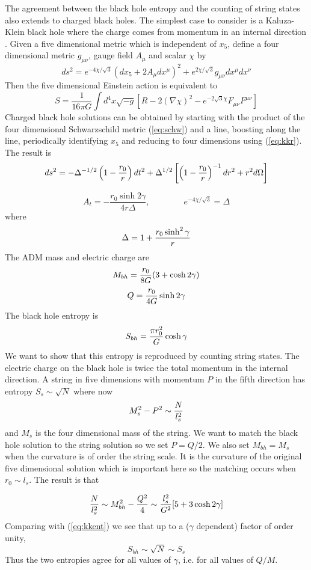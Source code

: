 \documentclass[12pt]{article}
\newcommand{\eq}{\begin{equation}}
\newcommand{\eqe}{\end{equation}}
\newcommand{\e}[1]{\label{eq:#1}}
\newcommand{\ee}[1]{(\ref{eq:#1})}
\begin{document}
The agreement between the black hole entropy and the counting of
string states also extends to charged black holes. The simplest
case to consider is a Kaluza-Klein black hole where the charge comes from 
momentum in an internal direction \cite{kk}. 
Given  a five dimensional metric which is
independent of $x_5$, define a four dimensional metric $g_{\mu\nu}$,
gauge field $A_\mu$ and scalar $\chi$ by
\eq\e{kkr}
ds^2 = e^{-4\chi/\sqrt 3} ( dx_5 + 2 A_\mu dx^\mu)^2
+ e^{2\chi/\sqrt 3} g_{\mu\nu} dx^\mu dx^\nu 
\eqe
Then the five dimensional Einstein action is equivalent to
\eq
S= \frac{1}{16\pi G} \int d^4x \sqrt{-g}[R - 2(\nabla \chi)^2 - 
e^{-2\sqrt 3 \chi}F_{\mu\nu} F^{\mu\nu}]
\eqe
Charged black hole solutions can
be obtained by starting with the product of the four dimensional 
Schwarzschild metric \ee{schw} and a line, boosting along the line,  
periodically identifying $x_5$ and reducing to four dimensions using 
\ee{kkr}. The result is
\eq\e{kkbh}
ds^2 = -\Delta^{-1/2}\left( 1-{r_0\over r}\right) dt^2 +
 \Delta^{1/2}\left [\left( 1-{r_0\over r}\right)^{-1} dr^2  + r^2 d\Omega
 \right ]
  \eqe

  $$A_t =-\frac{r_0\sinh 2\gamma}{4r\Delta}, \qquad \qquad 
e^{-4\chi/\sqrt{3}} = \Delta$$
  where
  $$ \Delta = 1+{r_0 \sinh^2 \gamma\over r} $$
The ADM mass and electric charge are
\eq
M_{bh}= {r_0\over 8G} (3+\cosh 2\gamma)
\eqe
\eq
Q= {r_0\over 4G} \sinh 2\gamma
\eqe
The black hole entropy is
\eq\e{kkent}
S_{bh} = {\pi r_0^2\over G} \cosh \gamma
\eqe
We want to show that this entropy is reproduced by  counting  string
states. The electric charge on the black hole is twice the total momentum 
in the internal direction. A string in five dimensions with momentum $P$ 
in the fifth direction  
has entropy $S_s \sim \sqrt N$ where now 
\eq\e{kkstates}
M_s^2 - P^2 \sim {N\over l_s^2}
\eqe
and $M_s$ is the four dimensional mass of the string. We want to match
the black hole solution to the string solution so we set $P=Q/2$. We also
set $M_{bh}=M_s$ when the curvature is
of order the string scale. It is the curvature of the original five dimensional
solution which is important here so the matching occurs when $r_0 \sim l_s$.
The result is that

\eq\e{ndef}
{N\over l_s^2} \sim  M_{bh}^2 - {Q^2\over 4} \sim {l_s^2 \over G^2}
[5+3\cosh 2\gamma] 
\eqe
Comparing with \ee{kkent} we see that up to a ($\gamma$ dependent)
factor of order unity,
\eq
S_{bh} \sim \sqrt N \sim S_s
\eqe
Thus the two entropies agree for all values of $\gamma$, i.e. for all
values of $Q/M$.
\end{document}
